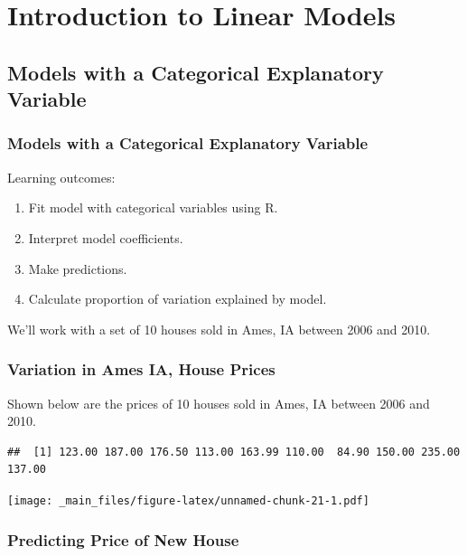 \documentclass[]{book}
\providecommand{\tightlist}{%
  \setlength{\itemsep}{0pt}\setlength{\parskip}{0pt}}
\begin{document}
\chapter{Introduction to Linear
Models}\label{introduction-to-linear-models}

\section{Models with a Categorical Explanatory
Variable}\label{models-with-a-categorical-explanatory-variable}

\subsection{Models with a Categorical Explanatory
Variable}\label{models-with-a-categorical-explanatory-variable-1}

Learning outcomes:

\begin{enumerate}
\def\labelenumi{\arabic{enumi}.}
\tightlist
\item
  Fit model with categorical variables using R.\\
\item
  Interpret model coefficients.\\
\item
  Make predictions.\\
\item
  Calculate proportion of variation explained by model.
\end{enumerate}

We'll work with a set of 10 houses sold in Ames, IA between 2006 and
2010.

\subsection{Variation in Ames IA, House
Prices}\label{variation-in-ames-ia-house-prices}

Shown below are the prices of 10 houses sold in Ames, IA between 2006
and 2010.

\begin{verbatim}
##  [1] 123.00 187.00 176.50 113.00 163.99 110.00  84.90 150.00 235.00 137.00
\end{verbatim}

\texttt{[image: \_main\_files/figure-latex/unnamed-chunk-21-1.pdf]}

\subsection{Predicting Price of New
House}\label{predicting-price-of-new-house}
\end{document}
